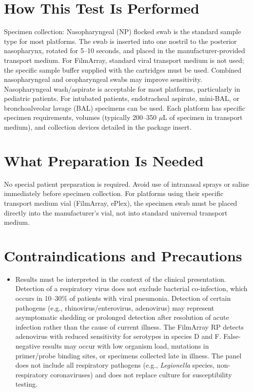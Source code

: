 \section*{How This Test Is Performed}
Specimen collection: Nasopharyngeal (NP) flocked swab is the standard sample type for most platforms. The swab is inserted into one nostril to the posterior nasopharynx, rotated for 5--10 seconds, and placed in the manufacturer-provided transport medium. For FilmArray, standard viral transport medium is not used; the specific sample buffer supplied with the cartridges must be used. Combined nasopharyngeal and oropharyngeal swabs may improve sensitivity. Nasopharyngeal wash/aspirate is acceptable for most platforms, particularly in pediatric patients. For intubated patients, endotracheal aspirate, mini-BAL, or bronchoalveolar lavage (BAL) specimens can be used. Each platform has specific specimen requirements, volumes (typically 200--350 $\mu$L of specimen in transport medium), and collection devices detailed in the package insert.

\section*{What Preparation Is Needed}
No special patient preparation is required. Avoid use of intranasal sprays or saline immediately before specimen collection. For platforms using their specific transport medium vial (FilmArray, ePlex), the specimen swab must be placed directly into the manufacturer's vial, not into standard universal transport medium.

\section*{Contraindications and Precautions}
\begin{itemize}
  \item Results must be interpreted in the context of the clinical presentation. Detection of a respiratory virus does not exclude bacterial co-infection, which occurs in 10--30\% of patients with viral pneumonia. Detection of certain pathogens (e.g., rhinovirus/enterovirus, adenovirus) may represent asymptomatic shedding or prolonged detection after resolution of acute infection rather than the cause of current illness. The FilmArray RP detects adenovirus with reduced sensitivity for serotypes in species D and F. False-negative results may occur with low organism load, mutations in primer/probe binding sites, or specimens collected late in illness. The panel does not include all respiratory pathogens (e.g., \textit{Legionella} species, non-respiratory coronaviruses) and does not replace culture for susceptibility testing.
\end{itemize}
